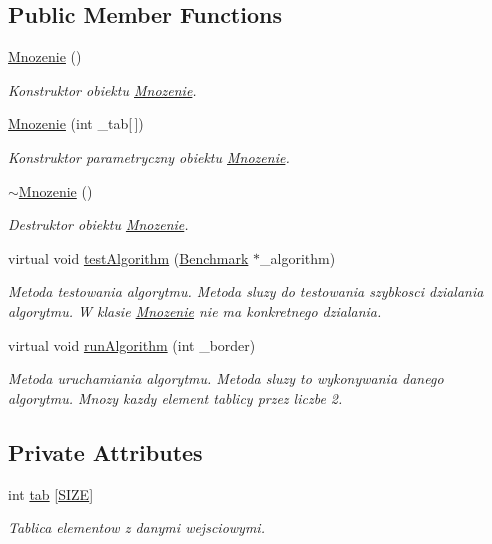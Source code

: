\subsection*{Public Member Functions}
\begin{DoxyCompactItemize}
\item 
\hyperlink{class_mnozenie_aac38391baa7ffd14970526902ab750de}{Mnozenie} ()
\begin{DoxyCompactList}\small\item\em Konstruktor obiektu \hyperlink{class_mnozenie}{Mnozenie}. \end{DoxyCompactList}\item 
\hyperlink{class_mnozenie_a8babd869ba0bd289e1e4287d6d8b56f2}{Mnozenie} (int \-\_\-tab\mbox{[}$\,$\mbox{]})
\begin{DoxyCompactList}\small\item\em Konstruktor parametryczny obiektu \hyperlink{class_mnozenie}{Mnozenie}. \end{DoxyCompactList}\item 
\hyperlink{class_mnozenie_ad57f03bc66770fb6a442169781ee2156}{$\sim$\-Mnozenie} ()
\begin{DoxyCompactList}\small\item\em Destruktor obiektu \hyperlink{class_mnozenie}{Mnozenie}. \end{DoxyCompactList}\item 
virtual void \hyperlink{class_mnozenie_a039792aaa5ce9723cd61d29869cf0101}{test\-Algorithm} (\hyperlink{class_benchmark}{Benchmark} $\ast$\-\_\-algorithm)
\begin{DoxyCompactList}\small\item\em Metoda testowania algorytmu. Metoda sluzy do testowania szybkosci dzialania algorytmu. W klasie \hyperlink{class_mnozenie}{Mnozenie} nie ma konkretnego dzialania. \end{DoxyCompactList}\item 
virtual void \hyperlink{class_mnozenie_a46b1c55b7ba208fa137065147e107be9}{run\-Algorithm} (int \-\_\-border)
\begin{DoxyCompactList}\small\item\em Metoda uruchamiania algorytmu. Metoda sluzy to wykonywania danego algorytmu. Mnozy kazdy element tablicy przez liczbe 2. \end{DoxyCompactList}\end{DoxyCompactItemize}
\subsection*{Private Attributes}
\begin{DoxyCompactItemize}
\item 
int \hyperlink{class_mnozenie_a6dc67671f84a557d97c322b8af528359}{tab} \mbox{[}\hyperlink{benchmark_8hh_a70ed59adcb4159ac551058053e649640}{S\-I\-Z\-E}\mbox{]}
\begin{DoxyCompactList}\small\item\em Tablica elementow z danymi wejsciowymi. \end{DoxyCompactList}\end{DoxyCompactItemize}


